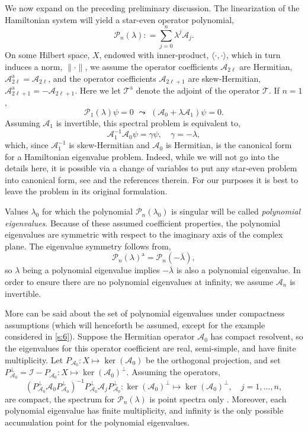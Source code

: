 \documentclass[review,onefignum,onetabnum]{siamart171218}
\def\ker{\mathop\mathrm{ker}\nolimits}
\def\coloneqq{\mathrel{\mathop:}=}
\newcommand{\rma}{\mathrm{a}}
\newcommand{\calA}{\mathcal{A}}
\newcommand{\calI}{\mathcal{I}}
\newcommand{\calP}{\mathcal{P}}
\newcommand{\calT}{\mathcal{T}}
\begin{document}
We now expand on the preceding preliminary discussion. The linearization of the Hamiltonian system will yield a star-even operator polynomial,
\[
\calP_n(\lambda)\coloneqq\sum_{j=0}^n\lambda^j\calA_j.
\]
On some Hilbert space, $X$, endowed with inner-product,
$\langle\cdot,\cdot\rangle$, which in turn induces a norm, $\|\cdot\|$,
we assume the operator coefficients $\calA_{2\ell}$ are
Hermitian, $\calA_{2\ell}^\rma=\calA_{2\ell}$, and the operator coefficients
$\calA_{2\ell+1}$ are skew-Hermitian,
$\calA_{2\ell+1}^\rma=-\calA_{2\ell+1}$. Here we let $\calT^\rma$ denote the adjoint of the operator $\calT$. If $n=1$,
\[
\calP_1(\lambda)\psi=0\,\,\leadsto\,\,
\left(\calA_0+\lambda\calA_1\right)\psi=0.
\]
Assuming $\calA_1$ is invertible, this spectral problem is equivalent to,
\[
\calA_1^{-1}\calA_0\psi=\gamma\psi,\quad\gamma=-\lambda,
\]
which, since $\calA_1^{-1}$ is skew-Hermitian and $\calA_0$ is Hermitian, is the canonical form for a Hamiltonian eigenvalue problem. Indeed, while we will not go into the details here, it is possible via a change of variables to put any star-even problem into canonical form, see \cite[Section~3]{kapitula:iif13} and the references therein. For our purposes it is best to leave the problem in its original formulation.

Values $\lambda_0$ for which the polynomial
$\calP_n(\lambda_0)$ is singular will be called \textit{polynomial
eigenvalues}. Because of these assumed coefficient properties, the polynomial
eigenvalues are symmetric with respect to the imaginary axis of the complex
plane. The eigenvalue symmetry follows from,
\[
\calP_n(\lambda)^\rma=\calP_n(-\overline{\lambda}),
\]
so $\lambda$ being a polynomial eigenvalue implies $-\overline{\lambda}$ is also a polynomial eigenvalue.
In order to ensure there are no polynomial eigenvalues at infinity, we assume
$\calA_n$ is invertible.

More can be said about the set of polynomial eigenvalues under compactness
assumptions (which will henceforth be assumed, except for the example considered in \cref{s:6}). Suppose the Hermitian
operator $\calA_0$ has compact resolvent, so the eigenvalues for this
operator coefficient are real, semi-simple, and have finite multiplicity. Let
$P_{\calA_0}:X\mapsto\ker(\calA_0)$ be the orthogonal projection, and set
$P_{\calA_0}^\perp=\calI-P_{\calA_0}:X\mapsto\ker(\calA_0)^\perp$. Assuming
the operators,
\[
\left(P_{\calA_0}^\perp\calA_0P_{\calA_0}^\perp\right)^{-1}
P_{\calA_0}^\perp\calA_jP_{\calA_0}^\perp:\ker(\calA_0)^\perp\mapsto\ker(\calA_0)^\perp,\quad
j=1,\dots,n,
\]
are compact, the spectrum for $\calP_n(\lambda)$ is point spectra only
\cite[Remark~2.2]{bronski:aii14}. Moreover, each polynomial eigenvalue has
finite multiplicity, and infinity is the only possible accumulation point for
the polynomial eigenvalues.
\end{document}

